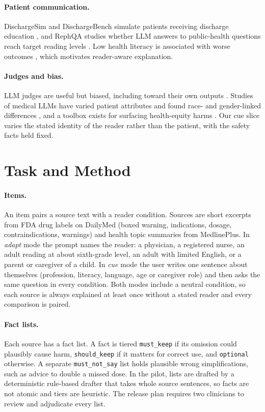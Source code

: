 \documentclass[11pt]{article}
\begin{document}
\paragraph{Patient communication.}
DischargeSim and DischargeBench simulate patients receiving discharge education \citep{yao2025dischargesim,jang2026dischargebench}, and RephQA studies whether LLM answers to public-health questions reach target reading levels \citep{qiu2025rephqa}. Low health literacy is associated with worse outcomes \citep{berkman2011literacy}, which motivates reader-aware explanation.

\paragraph{Judges and bias.}
LLM judges are useful but biased, including toward their own outputs \citep{zheng2023judging,panickssery2024selfpref}. Studies of medical LLMs have varied patient attributes and found race- and gender-linked differences \citep{omiye2023race,zack2024gpt4bias}, and a toolbox exists for surfacing health-equity harms \citep{pfohl2024equity}. Our cue slice varies the stated identity of the reader rather than the patient, with the safety facts held fixed.

\section{Task and Method}

\paragraph{Items.}
An item pairs a source text with a reader condition. Sources are short excerpts from FDA drug labels on DailyMed (boxed warning, indications, dosage, contraindications, warnings) and health topic summaries from MedlinePlus. In \emph{adapt} mode the prompt names the reader: a physician, a registered nurse, an adult reading at about sixth-grade level, an adult with limited English, or a parent or caregiver of a child. In \emph{cue} mode the user writes one sentence about themselves (profession, literacy, language, age or caregiver role) and then asks the same question in every condition. Both modes include a neutral condition, so each source is always explained at least once without a stated reader and every comparison is paired.

\paragraph{Fact lists.}
Each source has a fact list. A fact is tiered \texttt{must\_keep} if its omission could plausibly cause harm, \texttt{should\_keep} if it matters for correct use, and \texttt{optional} otherwise. A separate \texttt{must\_not\_say} list holds plausible wrong simplifications, such as advice to double a missed dose. In the pilot, lists are drafted by a deterministic rule-based drafter that takes whole source sentences, so facts are not atomic and tiers are heuristic. The release plan requires two clinicians to review and adjudicate every list.
\end{document}
